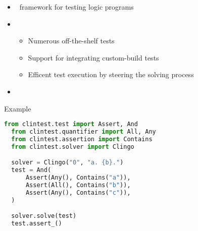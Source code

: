 \begin{frame}{\clintest}
  \begin{itemize}
  \item {} \  framework for testing logic programs
  \item {}
    \begin{itemize}
    \item Numerous off-the-shelf tests
    \item Support for integrating custom-build tests
    \item Efficent test execution by steering the solving process
    \end{itemize}
  \item {} \ \clingo
  \end{itemize}
\end{frame}
\begin{frame}[fragile]{Example}
  \begin{lstlisting}[language=python,basicstyle=\small\ttfamily]
  from clintest.test import Assert, And
  from clintest.quantifier import All, Any
  from clintest.assertion import Contains
  from clintest.solver import Clingo

  solver = Clingo("0", "a. {b}.")
  test = And(
      Assert(Any(), Contains("a")),
      Assert(All(), Contains("b")),
      Assert(Any(), Contains("c")),
  )

  solver.solve(test)
  test.assert_()
  \end{lstlisting}
  \end{frame}
%
